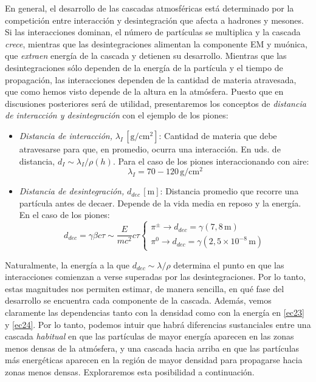 \documentclass[12 pt, a4paper]{article} %
\numberwithin{equation}{section}
\numberwithin{figure}{section}
\numberwithin{table}{section}
\begin{document}
En general, el desarrollo de las cascadas atmosféricas está determinado por la competición entre interacción y desintegración que afecta a hadrones y mesones. Si las interacciones dominan, el número de partículas se multiplica y la cascada \textit{crece}, mientras que las desintegraciones alimentan la componente EM y muónica, que \textit{extraen} energía de la cascada y detienen su desarrollo. Mientras que las desintegraciones sólo dependen de la energía de la partícula y el tiempo de propagación, las interacciones dependen de la cantidad de materia atravesada, que como hemos visto depende de la altura en la atmósfera. Puesto que en discusiones posteriores será de utilidad, presentaremos los conceptos de \textit{distancia de interacción y desintegración} con el ejemplo de los piones:
\begin{itemize}
	\item \textit{Distancia de interacción,} $\lambda_I\,\left[\mathrm{g/cm^2}\right]$: Cantidad de materia que debe atravesarse para que, en promedio, ocurra una interacción. En uds. de distancia, $d_I\sim\lambda_I/\rho(h)$. Para el caso de los piones interaccionando con aire:
\begin{equation}
		\lambda_I=70-120\,\mathrm{g/cm^2}\label{ec23}
\end{equation}

\item \textit{Distancia de desintegración, }$d_{dec}\,\left[\mathrm{m}\right]$: Distancia promedio que recorre una partícula antes de decaer. Depende de la vida media en reposo y la energía. En el caso de los piones:
\begin{equation}
	d_{dec}=\gamma\beta c\tau\sim\frac{E}{mc^2}c\tau\left\{\begin{array}{l}\pi^\pm\rightarrow d_{dec}=\gamma\left(7,8 \,\mathrm{m}\right)\\
\pi^0\rightarrow d_{dec}=\gamma\left(2,5\times10^{-8}\,\mathrm{m}\right)\end{array}\right.
\label{ec24}
\end{equation}
\end{itemize}
Naturalmente, la energía a la que $d_{dec}\sim\lambda/\rho$ determina el punto en que las interacciones comienzan a verse superadas por las desintegraciones. Por lo tanto, estas magnitudes nos permiten estimar, de manera sencilla, en qué fase del desarrollo se encuentra cada componente de la cascada. Además, vemos claramente las dependencias tanto con la densidad como con la energía en \eqref{ec23} y \eqref{ec24}. Por lo tanto, podemos intuir que habrá diferencias sustanciales entre una cascada \textit{habitual} en que las partículas de mayor energía aparecen en las zonas menos densas de la atmósfera, y una cascada hacia arriba en que las partículas más energéticas aparecen en la región de mayor densidad para propagarse hacia zonas menos densas. Exploraremos esta posibilidad a continuación.
\end{document}
